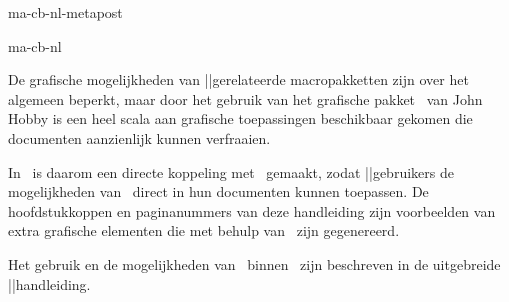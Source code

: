 \startonderdeel ma-cb-nl-metapost

\produkt ma-cb-nl


\index[metapost]{\METAPOST}

De grafische mogelijkheden van \TEX||gerelateerde
macropakketten zijn over het algemeen beperkt, maar door het
gebruik van het grafische pakket \METAPOST\ van John Hobby
is een heel scala aan grafische toepassingen beschikbaar
gekomen die documenten aanzienlijk kunnen verfraaien.

In \CONTEXT\ is daarom een directe koppeling met \METAPOST\
gemaakt, zodat \CONTEXT||gebruikers de mogelijkheden van
\METAPOST\ direct in hun documenten kunnen toepassen. De
hoofdstukkoppen en paginanummers van deze handleiding zijn
voorbeelden van extra grafische elementen die met behulp van
\METAPOST\ zijn gegenereerd.

Het gebruik en de mogelijkheden van \METAPOST\ binnen
\CONTEXT\ zijn beschreven in de uitgebreide
\METAFUN||handleiding.

\stoponderdeel
